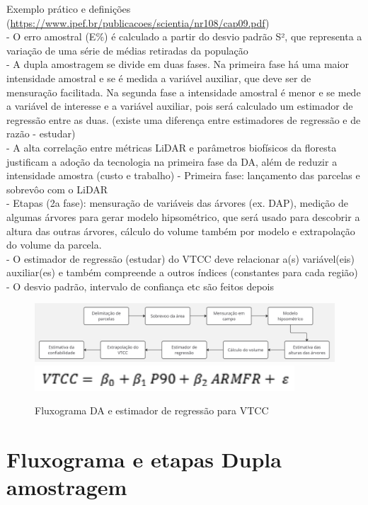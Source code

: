 \documentclass[
]{article}
\begin{document}
Exemplo prático e definições
(\url{https://www.ipef.br/publicacoes/scientia/nr108/cap09.pdf})\\
- O erro amostral (E\%) é calculado a partir do desvio padrão S², que
representa a variação de uma série de médias retiradas da população\\
- A dupla amostragem se divide em duas fases. Na primeira fase há uma
maior intensidade amostral e se é medida a variável auxiliar, que deve
ser de mensuração facilitada. Na segunda fase a intensidade amostral é
menor e se mede a variável de interesse e a variável auxiliar, pois será
calculado um estimador de regressão entre as duas. (existe uma diferença
entre estimadores de regressão e de razão - estudar)\\
- A alta correlação entre métricas LiDAR e parâmetros biofísicos da
floresta justificam a adoção da tecnologia na primeira fase da DA, além
de reduzir a intensidade amostra (custo e trabalho) - Primeira fase:
lançamento das parcelas e sobrevôo com o LiDAR\\
- Etapas (2a fase): mensuração de variáveis das árvores (ex. DAP),
medição de algumas árvores para gerar modelo hipsométrico, que será
usado para descobrir a altura das outras árvores, cálculo do volume
também por modelo e extrapolação do volume da parcela.\\
- O estimador de regressão (estudar) do VTCC deve relacionar a(s)
variável(eis) auxiliar(es) e também compreende a outros índices
(constantes para cada região)\\
- O desvio padrão, intervalo de confiança etc são feitos depois

\begin{figure}

{\centering \includegraphics[width=0.45\linewidth]{IMAGES/fluxograma-da-lidar-e-campo} \includegraphics[width=0.45\linewidth]{IMAGES/eq-estimador-regressao} 

}

\caption{Fluxograma DA e estimador de regressão para VTCC}\label{fig:unnamed-chunk-6}
\end{figure}

\section{Fluxograma e etapas Dupla
amostragem}\label{fluxograma-e-etapas-dupla-amostragem}
\end{document}
